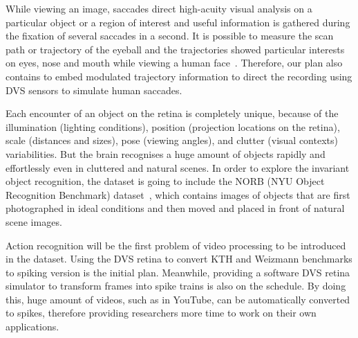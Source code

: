 While viewing an image,  saccades direct high-acuity visual analysis on a particular object or a region of interest and useful information is gathered during the fixation of several saccades in a second.
It is possible to measure the scan path or trajectory of the eyeball and the trajectories showed particular interests on eyes, nose and mouth while viewing a human face~\citep{yarbus1967eye}.
Therefore, our plan also contains to embed modulated trajectory information to direct the recording using DVS sensors to simulate human saccades.


Each encounter of an object on the retina is completely unique, because of the illumination (lighting conditions), position (projection locations on the retina), scale (distances and sizes), pose (viewing angles), and clutter (visual contexts) variabilities.
But the brain recognises a huge amount of objects rapidly and effortlessly even in cluttered and natural scenes.
In order to explore the invariant object recognition, the dataset is going to include the NORB (NYU Object Recognition Benchmark) dataset~\citep{lecun2004learning}, which contains images of objects that are first photographed in ideal conditions and then moved and placed in front of natural scene images. 

Action recognition will be the first problem of video processing to be introduced in the dataset.
Using the DVS retina to convert KTH and Weizmann benchmarks to spiking version is the initial plan.
Meanwhile, providing a software DVS retina simulator to transform  frames into spike trains is also on the schedule.
By doing this, huge amount of videos, such as in YouTube, can be automatically converted to spikes, therefore providing researchers more time to work on their own applications.


